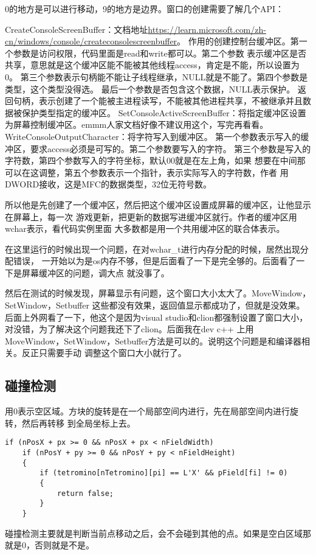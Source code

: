 \documentclass{article}
\begin{document}
\begin{sloppypar}
\begin{lstlisting}
\end{lstlisting}
0的地方是可以进行移动，9的地方是边界。窗口的创建需要了解几个API：
\begin{outline}
	\1 CreateConsoleScreenBuffer：文档地址\url{https://learn.microsoft.com/zh-cn/windows/console/createconsolescreenbuffer}。
		\2 作用的创建控制台缓冲区。第一个参数是访问权限，代码里面是read和write都可以。第二个参数
		表示缓冲区是否共享，意思就是这个缓冲区能不能被其他线程access，肯定是不能，所以设置为0。
		第三个参数表示句柄能不能让子线程继承，NULL就是不能了。第四个参数是类型，这个类型没得选。
		最后一个参数是否包含这个数据，NULL表示保护。
		\2 返回句柄，表示创建了一个能被主进程读写，不能被其他进程共享，不被继承并且数据被保护类型指定的缓冲区。
    \1 SetConsoleActiveScreenBuffer：将指定缓冲区设置为屏幕控制缓冲区。emmm人家文档好像不建议用这个，写完再看看。
	\1 WriteConsoleOutputCharacter：将字符写入到缓冲区。
		\2 第一个参数表示写入的缓冲区，要求access必须是可写的。第二个参数要写入的字符。
		第三个参数是写入的字符数，第四个参数写入的字符坐标，默认00就是在左上角，如果
		想要在中间那可以在这调整，第五个参数表示一个指针，表示实际写入的字符数，作者
		用DWORD接收，这是MFC的数据类型，32位无符号数。
\end{outline}
所以他是先创建了一个缓冲区，然后把这个缓冲区设置成屏幕的缓冲区，让他显示在屏幕上，每一次
游戏更新，把更新的数据写进缓冲区就行。作者的缓冲区用wchar表示，看代码实例里面
大多数都是用一个共用缓冲区的联合体表示。

在这里运行的时候出现一个问题，在对wchar\_t进行内存分配的时候，居然出现分配错误，
一开始以为是os内存不够，但是后面看了一下是完全够的。后面看了一下是屏幕缓冲区的问题，调大点
就没事了。

然后在测试的时候发现，屏幕显示有问题，这个窗口大小太大了。MoveWindow，SetWindow，Setbuffer
这些都没有效果，返回值显示都成功了，但就是没效果。后面上外网看了一下，他这个是因为visual 
studio和clion都强制设置了窗口大小，对没错，为了解决这个问题我还下了clion。后面我在dev c++
上用MoveWindow，SetWindow，Setbuffer方法是可以的。说明这个问题是和编译器相关。反正只需要手动
调整这个窗口大小就行了。

\subsection{碰撞检测}
用0表示空区域。方块的旋转是在一个局部空间内进行，先在局部空间内进行旋转，然后再转移
到全局坐标上去。
\begin{lstlisting}
if (nPosX + px >= 0 && nPosX + px < nFieldWidth)
	if (nPosY + py >= 0 && nPosY + py < nFieldHeight)
	{
		if (tetromino[nTetromino][pi] == L'X' && pField[fi] != 0)
		{
			return false;
		}
	}
\end{lstlisting}
碰撞检测主要就是判断当前点移动之后，会不会碰到其他的点。如果是空白区域那就是0，否则就是不是。


\end{sloppypar}
\end{document}

